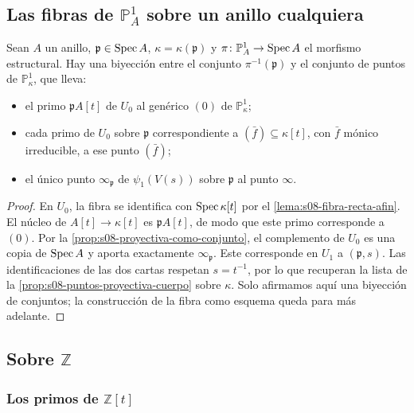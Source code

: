 \subsection{Las fibras de \texorpdfstring{$\mathbb P_A^1$}{P1A} sobre un anillo cualquiera}

\begin{prop}
\label{prop:s08-fibras-proyectiva}
Sean $A$ un anillo, $\mathfrak p\in\operatorname{Spec} A$, $\kappa=\kappa(\mathfrak p)$ y $\pi\colon \mathbb P_A^1\to\operatorname{Spec} A$ el morfismo estructural. Hay una biyección entre el conjunto $\pi^{-1}(\mathfrak p)$ y el conjunto de puntos de $\mathbb P_\kappa^1$, que lleva:
\begin{itemize}
\item el primo $\mathfrak pA[t]$ de $U_0$ al genérico $(0)$ de $\mathbb P_\kappa^1$;
\item cada primo de $U_0$ sobre $\mathfrak p$ correspondiente a $(\bar f)\subseteq\kappa[t]$, con $\bar f$ mónico irreducible, a ese punto $(\bar f)$;
\item el único punto $\infty_{\mathfrak p}$ de $\psi_1(V(s))$ sobre $\mathfrak p$ al punto $\infty$.
\end{itemize}
\end{prop}
\begin{proof}
En $U_0$, la fibra se identifica con $\operatorname{Spec}\kappa[t]$ por el \cref{lema:s08-fibra-recta-afin}. El núcleo de $A[t]\to\kappa[t]$ es $\mathfrak pA[t]$, de modo que este primo corresponde a $(0)$. Por la \cref{prop:s08-proyectiva-como-conjunto}, el complemento de $U_0$ es una copia de $\operatorname{Spec} A$ y aporta exactamente $\infty_{\mathfrak p}$. Este corresponde en $U_1$ a $(\mathfrak p,s)$. Las identificaciones de las dos cartas respetan $s=t^{-1}$, por lo que recuperan la lista de la \cref{prop:s08-puntos-proyectiva-cuerpo} sobre $\kappa$. Solo afirmamos aquí una biyección de conjuntos; la construcción de la fibra como esquema queda para más adelante.
\end{proof}

\subsection{Sobre \texorpdfstring{$\mathbb Z$}{Z}}

\subsubsection{Los primos de \texorpdfstring{$\mathbb Z[t]$}{Z[t]}}

